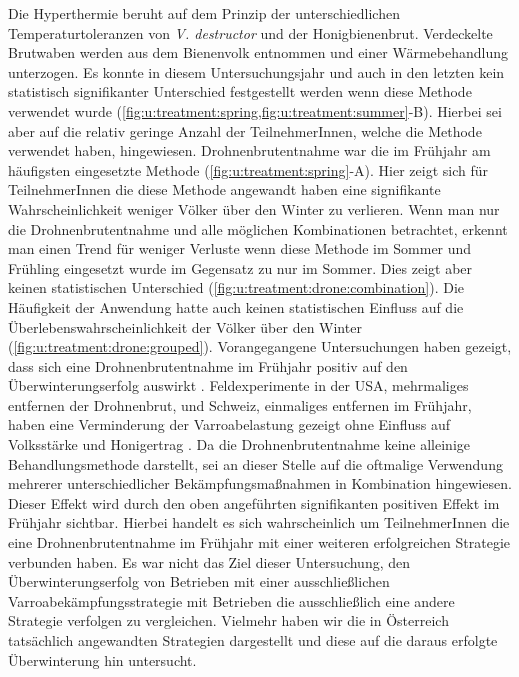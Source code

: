 Die Hyperthermie beruht auf dem Prinzip der unterschiedlichen Temperaturtoleranzen von \textit{V. destructor} und der Honigbienenbrut. Verdeckelte Brutwaben werden aus dem Bienenvolk entnommen und einer Wärmebehandlung unterzogen. Es konnte in diesem Untersuchungsjahr und auch in den letzten kein statistisch signifikanter Unterschied festgestellt werden wenn diese Methode verwendet wurde \citep{crailsheim2018, oberreiter2020} (\cref{fig:u:treatment:spring,fig:u:treatment:summer}-B). Hierbei sei aber auf die relativ geringe Anzahl der TeilnehmerInnen, welche die Methode verwendet haben, hingewiesen.
\newline
Drohnenbrutentnahme war die im Frühjahr am häufigsten eingesetzte Methode (\cref{fig:u:treatment:spring}-A). Hier zeigt sich für TeilnehmerInnen die diese Methode angewandt haben eine signifikante Wahrscheinlichkeit weniger Völker über den Winter zu verlieren. Wenn man nur die Drohnenbrutentnahme und alle möglichen Kombinationen betrachtet, erkennt man einen Trend für weniger Verluste wenn diese Methode im Sommer und Frühling eingesetzt wurde im Gegensatz zu nur im Sommer. Dies zeigt aber keinen statistischen Unterschied (\cref{fig:u:treatment:drone:combination}). Die Häufigkeit der Anwendung hatte auch keinen statistischen Einfluss auf die Überlebenswahrscheinlichkeit der Völker über den Winter (\cref{fig:u:treatment:drone:grouped}). Vorangegangene Untersuchungen haben gezeigt, dass sich eine Drohnenbrutentnahme im Frühjahr positiv auf den Überwinterungserfolg auswirkt \citep{brodschneider2013, oberreiter2020, crailsheim2018}. Feldexperimente in der USA, mehrmaliges entfernen der Drohnenbrut, und Schweiz, einmaliges entfernen im Frühjahr, haben eine Verminderung der Varroabelastung gezeigt ohne Einfluss auf Volksstärke und Honigertrag \citep{charriere1998, calderone2005}. Da die Drohnenbrutentnahme keine alleinige Behandlungsmethode darstellt, sei an dieser Stelle auf die oftmalige Verwendung mehrerer unterschiedlicher Bekämpfungsmaßnahmen in Kombination hingewiesen. Dieser Effekt wird durch den oben angeführten signifikanten positiven Effekt im Frühjahr sichtbar. Hierbei handelt es sich wahrscheinlich um TeilnehmerInnen die eine Drohnenbrutentnahme im Frühjahr mit einer weiteren erfolgreichen Strategie verbunden haben. Es war nicht das Ziel dieser Untersuchung, den Überwinterungserfolg von Betrieben mit einer ausschließlichen Varroabekämpfungsstrategie mit Betrieben die ausschließlich eine andere Strategie verfolgen zu vergleichen. Vielmehr haben wir die in Österreich tatsächlich angewandten Strategien dargestellt und diese auf die daraus erfolgte Überwinterung hin untersucht. 

